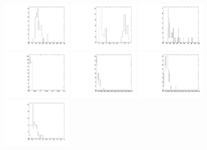 \begin{figure}
  \centering
  \includegraphics[width=0.3\textwidth]{Figures/AfterBDTCut_pt_EndcapsUnblinded.pdf}
  \includegraphics[width=0.3\textwidth]{Figures/AfterBDTCut_eta_EndcapsUnblinded.pdf}
  \includegraphics[width=0.3\textwidth]{Figures/AfterBDTCut_fls3d_EndcapsUnblinded.pdf}
  \includegraphics[width=0.3\textwidth]{Figures/AfterBDTCut_alpha_EndcapsUnblinded.pdf}
  \includegraphics[width=0.3\textwidth]{Figures/AfterBDTCut_maxdoca_EndcapsUnblinded.pdf}
  \includegraphics[width=0.3\textwidth]{Figures/AfterBDTCut_pvip_EndcapsUnblinded.pdf}
  \includegraphics[width=0.3\textwidth]{Figures/AfterBDTCut_pvips_EndcapsUnblinded.pdf}

\end{figure}
